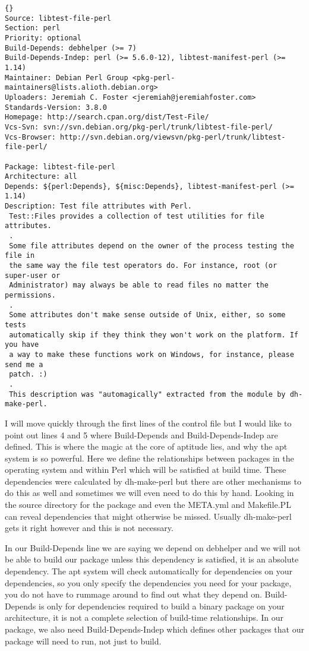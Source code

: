 \begin{lstlisting}[frame=trbl,label=cl:debs_cpan:control-file,caption=control]{}
Source: libtest-file-perl
Section: perl
Priority: optional
Build-Depends: debhelper (>= 7)
Build-Depends-Indep: perl (>= 5.6.0-12), libtest-manifest-perl (>= 1.14)
Maintainer: Debian Perl Group <pkg-perl-maintainers@lists.alioth.debian.org>
Uploaders: Jeremiah C. Foster <jeremiah@jeremiahfoster.com>
Standards-Version: 3.8.0
Homepage: http://search.cpan.org/dist/Test-File/
Vcs-Svn: svn://svn.debian.org/pkg-perl/trunk/libtest-file-perl/
Vcs-Browser: http://svn.debian.org/viewsvn/pkg-perl/trunk/libtest-file-perl/

Package: libtest-file-perl
Architecture: all
Depends: ${perl:Depends}, ${misc:Depends}, libtest-manifest-perl (>= 1.14)
Description: Test file attributes with Perl.
 Test::Files provides a collection of test utilities for file attributes.
 .
 Some file attributes depend on the owner of the process testing the file in
 the same way the file test operators do. For instance, root (or super-user or
 Administrator) may always be able to read files no matter the permissions.
 .
 Some attributes don't make sense outside of Unix, either, so some tests
 automatically skip if they think they won't work on the platform. If you have
 a way to make these functions work on Windows, for instance, please send me a
 patch. :)
 .
 This description was "automagically" extracted from the module by dh-make-perl.
\end{lstlisting}

I will move quickly through the f\hbox{}irst lines of the control f\hbox{}ile but I would like
to point out lines 4 and 5 where Build-Depends and Build-Depends-Indep are
def\hbox{}ined. This is where the magic at the core of aptitude lies, and why the apt
system is so powerful. Here we def\hbox{}ine the relationships between packages in the
operating system and within Perl which will be satisf\hbox{}ied at build time. These
dependencies were calculated by dh-make-perl but there are other mechanisms to
do this as well and sometimes we will even need to do this by hand. Looking in
the source directory for the package and even the META.yml and Makef\hbox{}ile.PL can
reveal dependencies that might otherwise be missed. Usually dh-make-perl gets it
right however and this is not necessary.

In our Build-Depends line we are saying we depend on debhelper and we will not
be able to build our package unless this dependency is satisf\hbox{}ied, it is an
absolute dependency. The apt system will check automatically for dependencies on
your dependencies, so you only specify the dependencies you need for your
package, you do not have to rummage around to f\hbox{}ind out what they depend on.
Build-Depends is only for dependencies required to build a binary package on
your architecture, it is not a complete selection of build-time relationships.
In our package, we also need Build-Depends-Indep which def\hbox{}ines other packages
that our package will need to run, not just to build. 

